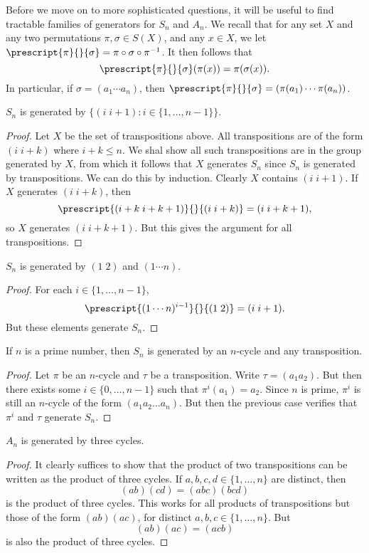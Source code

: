 Before we move on to more sophisticated questions, it will be useful to find tractable families of generators for $S_n$ and $A_n$. We recall that for any set $X$ and any two permutations $\pi, \sigma \in S(X)$, and any $x \in X$, we let $\prescript{\pi}{}{\sigma} = \pi \circ \sigma \circ \pi^{-1}$. It then follows that
%
\[ \prescript{\pi}{}{\sigma}(\pi(x)) = \pi(\sigma(x)). \]
%
In particular, if $\sigma = (a_1 \cdots a_n)$, then $\prescript{\pi}{}{\sigma} = (\pi(a_1) \cdots \pi(a_n))$.

\begin{lemma}
    $S_n$ is generated by $\{ (i\; i+1): i \in \{ 1, \dots, n -1 \} \}$.
\end{lemma}
\begin{proof}
    Let $X$ be the set of transpositions above. All transpositions are of the form $(i\; i+k)$ where $i + k \leq n$. We shal show all such transpositions are in the group generated by $X$, from which it follows that $X$ generates $S_n$ since $S_n$ is generated by transpositions. We can do this by induction. Clearly $X$ contains $(i\; i+1)$. If $X$ generates $(i\; i+k)$, then
    \[ \prescript{(i+k\; i+k+1)}{}{(i\; i+k)} = (i\; i+k+1), \]
    so $X$ generates $(i\; i+k+1)$. But this gives the argument for all transpositions.
\end{proof}

\begin{lemma}
    $S_n$ is generated by $(1\; 2)$ and $(1 \cdots n)$.
\end{lemma}
\begin{proof}
    For each $i \in \{ 1, \dots, n-1 \}$,
    \[ \prescript{(1 \cdots n)^{i-1}}{}{(1\; 2)} = (i\; i+1). \]
    But these elements generate $S_n$.
\end{proof}

\begin{lemma}
    If $n$ is a prime number, then $S_n$ is generated by an $n$-cycle and any transposition.
\end{lemma}
\begin{proof}
    Let $\pi$ be an $n$-cycle and $\tau$ be a transposition. Write $\tau = (a_1 a_2)$. But then there exists some $i \in \{ 0, \dots, n-1 \}$ such that $\pi^i(a_1) = a_2$. Since $n$ is prime, $\pi^i$ is still an $n$-cycle of the form $(a_1 a_2 \dots a_n)$. But then the previous case verifies that $\pi^i$ and $\tau$ generate $S_n$.
\end{proof}

\begin{lemma}
    $A_n$ is generated by three cycles.
\end{lemma}
\begin{proof}
    It clearly suffices to show that the product of two transpositions can be written as the product of three cycles. If $a,b,c,d \in \{ 1, \dots, n \}$ are distinct, then
    \[ (ab)(cd) = (abc)(bcd) \]
    is the product of three cycles. This works for all products of transpositions but those of the form $(ab)(ac)$, for distinct $a,b,c \in \{ 1, \dots, n \}$. But
    \[ (ab)(ac) = (acb) \]
    is also the product of three cycles.
\end{proof}

